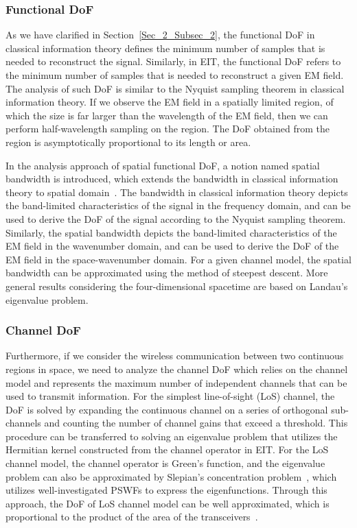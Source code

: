 \documentclass[journal,twocolumn]{IEEEtran}
\begin{document}
\subsubsection{Functional DoF}
As we have clarified in Section~\ref{Sec_2_Subsec_2}, the functional DoF in classical information theory defines the minimum number of samples that is needed to reconstruct the signal. Similarly, in EIT, the functional DoF refers to the minimum number of samples that is needed to reconstruct a given EM field. The analysis of such DoF is similar to the Nyquist sampling theorem in classical information theory. If we observe the EM field in a spatially limited region, of which the size is far larger than the wavelength of the EM field, then we can perform half-wavelength sampling on the region. The DoF obtained from the region is asymptotically proportional to its length or area. 



In the analysis approach of spatial functional DoF, a notion named spatial bandwidth is introduced, which extends the bandwidth in classical information theory to spatial domain~\cite{bucci1987spatial}. The bandwidth in classical information theory depicts the band-limited characteristics of the signal in the frequency domain, and can be used to derive the DoF of the signal according to the Nyquist sampling theorem. Similarly, the spatial bandwidth depicts the band-limited characteristics of the EM field in the wavenumber domain, and can be used to derive the DoF of the EM field in the space-wavenumber domain. For a given channel model, the spatial bandwidth can be approximated using the method of steepest descent. More general results considering the four-dimensional spacetime are based on Landau's eigenvalue problem.

\subsubsection{Channel DoF}
Furthermore, if we consider the wireless communication between two continuous regions in space, we need to analyze the channel DoF which relies on the channel model and represents the maximum number of independent channels that can be used to transmit information. For the simplest line-of-sight (LoS) channel, the DoF is solved by expanding the continuous channel on a series of orthogonal sub-channels and counting the number of channel gains that exceed a threshold. This procedure can be transferred to solving an eigenvalue problem that  utilizes the Hermitian kernel constructed from the channel operator in EIT. For the LoS channel model, the channel operator is Green's function, and the eigenvalue problem can also be approximated by Slepian's concentration problem~\cite{miller2000communicating}, which utilizes well-investigated PSWFs to express the eigenfunctions. Through this approach, the DoF of LoS channel model can be well approximated, which is proportional to the product of the area of the transceivers~\cite{pizzo2022nyquist,miller2000communicating}. 
\end{document}
